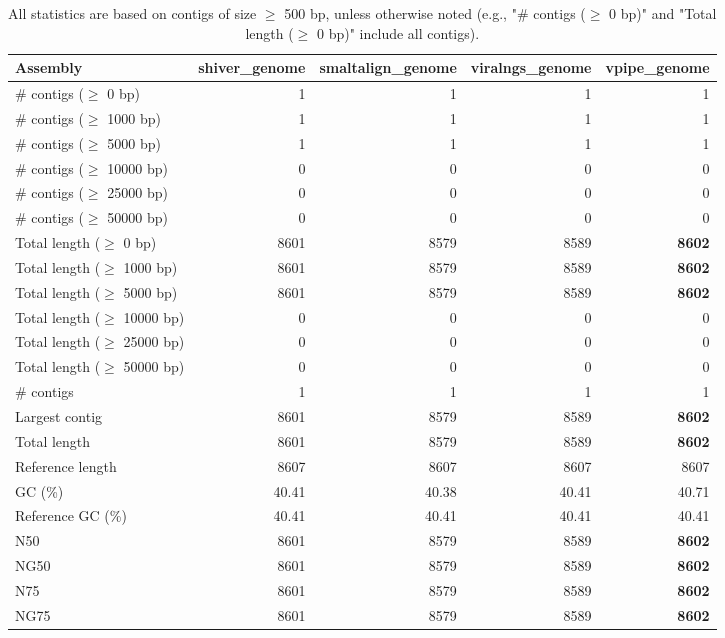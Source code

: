 \documentclass[12pt,a4paper]{article}
\begin{document}
\begin{table}[ht]
\begin{center}
\caption{All statistics are based on contigs of size $\geq$ 500 bp, unless otherwise noted (e.g., "\# contigs ($\geq$ 0 bp)" and "Total length ($\geq$ 0 bp)" include all contigs).}
\begin{tabular}{|l*{4}{|r}|}
\hline
Assembly & shiver\_genome & smaltalign\_genome & viralngs\_genome & vpipe\_genome \\ \hline
\# contigs ($\geq$ 0 bp) & 1 & 1 & 1 & 1 \\ \hline
\# contigs ($\geq$ 1000 bp) & 1 & 1 & 1 & 1 \\ \hline
\# contigs ($\geq$ 5000 bp) & 1 & 1 & 1 & 1 \\ \hline
\# contigs ($\geq$ 10000 bp) & 0 & 0 & 0 & 0 \\ \hline
\# contigs ($\geq$ 25000 bp) & 0 & 0 & 0 & 0 \\ \hline
\# contigs ($\geq$ 50000 bp) & 0 & 0 & 0 & 0 \\ \hline
Total length ($\geq$ 0 bp) & 8601 & 8579 & 8589 & {\bf 8602} \\ \hline
Total length ($\geq$ 1000 bp) & 8601 & 8579 & 8589 & {\bf 8602} \\ \hline
Total length ($\geq$ 5000 bp) & 8601 & 8579 & 8589 & {\bf 8602} \\ \hline
Total length ($\geq$ 10000 bp) & 0 & 0 & 0 & 0 \\ \hline
Total length ($\geq$ 25000 bp) & 0 & 0 & 0 & 0 \\ \hline
Total length ($\geq$ 50000 bp) & 0 & 0 & 0 & 0 \\ \hline
\# contigs & 1 & 1 & 1 & 1 \\ \hline
Largest contig & 8601 & 8579 & 8589 & {\bf 8602} \\ \hline
Total length & 8601 & 8579 & 8589 & {\bf 8602} \\ \hline
Reference length & 8607 & 8607 & 8607 & 8607 \\ \hline
GC (\%) & 40.41 & 40.38 & 40.41 & 40.71 \\ \hline
Reference GC (\%) & 40.41 & 40.41 & 40.41 & 40.41 \\ \hline
N50 & 8601 & 8579 & 8589 & {\bf 8602} \\ \hline
NG50 & 8601 & 8579 & 8589 & {\bf 8602} \\ \hline
N75 & 8601 & 8579 & 8589 & {\bf 8602} \\ \hline
NG75 & 8601 & 8579 & 8589 & {\bf 8602} \\ \hline

\end{tabular}
\end{center}
\end{table}
\end{document}

